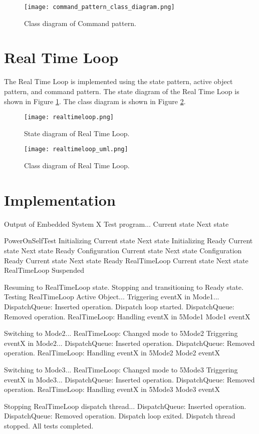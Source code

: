 \documentclass[../main.tex]{subfiles}
\begin{document}
\begin{figure}[h]
    \centering
    \texttt{[image: command\_pattern\_class\_diagram.png]}
    \caption{Class diagram of Command pattern.}
\end{figure}

\newpage

\section{Real Time Loop}

The Real Time Loop is implemented using the state pattern, active object pattern, and command pattern. The state diagram of the Real Time Loop is shown in Figure \ref{fig:rtl_state_diagram}. The class diagram is shown in Figure \ref{fig:rtl_implementation}.

\begin{figure}[h]
    \centering
    \texttt{[image: realtimeloop.png]}
    \caption{State diagram of Real Time Loop.}
    \label{fig:rtl_state_diagram}
\end{figure}

\begin{figure}[h]
    \centering
    \texttt{[image: realtimeloop\_uml.png]}
    \caption{Class diagram of Real Time Loop.}
    \label{fig:rtl_implementation}
\end{figure}

\newpage

\section{Implementation}

\begin{mintedterminal}{Output of Embedded System X}
Test program...
Current state   Next state

PowerOnSelfTest Initializing
Current state   Next state
Initializing    Ready
Current state   Next state
Ready           Configuration
Current state   Next state
Configuration   Ready
Current state   Next state
Ready           RealTimeLoop
Current state   Next state
RealTimeLoop    Suspended

Resuming to RealTimeLoop state.
Stopping and transitioning to Ready state.
Testing RealTimeLoop Active Object...
Triggering eventX in Mode1...
DispatchQueue: Inserted operation.
Dispatch loop started.
DispatchQueue: Removed operation.
RealTimeLoop: Handling eventX in 5Mode1
Mode1 eventX

Switching to Mode2...
RealTimeLoop: Changed mode to 5Mode2
Triggering eventX in Mode2...
DispatchQueue: Inserted operation.
DispatchQueue: Removed operation.
RealTimeLoop: Handling eventX in 5Mode2
Mode2 eventX

Switching to Mode3...
RealTimeLoop: Changed mode to 5Mode3
Triggering eventX in Mode3...
DispatchQueue: Inserted operation.
DispatchQueue: Removed operation.
RealTimeLoop: Handling eventX in 5Mode3
Mode3 eventX

Stopping RealTimeLoop dispatch thread...
DispatchQueue: Inserted operation.
DispatchQueue: Removed operation.
Dispatch loop exited.
Dispatch thread stopped.
All tests completed.
\end{mintedterminal}
\end{document}
